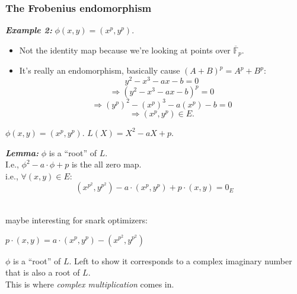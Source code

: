 \documentclass[shadesubsections,compress,14pt,mathserif]{beamer}
\newcommand{\Fclosure}{\ensuremath{{\overline{\mathbb{F}}}_p}}
\newcommand{\set}[1]{\ensuremath{\left\{#1\right\}}}
\newcommand{\defeq}{\ensuremath{:=}}
\newcommand{\hl}[1]{\textbf{\textit{#1}}}
\newcommand{\nl}{\\ \pause \vspace{0.2in}}
\newcommand{\nlnp}{\\ \vspace{0.2in}}
\begin{document}
\begin{frame}
\frametitle{The Frobenius endomorphism}

\hl{Example 2:}
 $\phi(x,y)=(x^p,y^p)$.\pause
 \begin{itemize}
  \item Not the identity map because we're looking at points over \Fclosure.\pause
  \item It's really an endomorphism, basically cause $(A+B)^p = A^p+B^p$:\pause
  \[y^2-x^3-ax-b=0\]\pause
  \[\Rightarrow \left(y^2-x^3-ax-b\right)^p=0\]\pause
  \[\Rightarrow (y^p)^2-(x^p)^3-a(x^p)-b =0\]\pause
  \[\Rightarrow (x^p,y^p)\in E.\]

 \end{itemize}

\end{frame}



\begin{frame}
$\phi(x,y)=(x^p,y^p)$. $L(X)=X^2-aX+p$.\nlnp

\hl{Lemma:} $\phi$ is a ``root'' of $L$.\nl
I.e., $\phi^2-a\cdot \phi + p$ is the all zero map.\nl
i.e.,  $\forall (x,y)\in E$:
\[ (x^{p^2},y^{p^2})-a\cdot (x^p,y^p)+p\cdot (x,y)=0_E\]\nl

maybe interesting for snark optimizers: 

$p\cdot (x,y) = a\cdot (x^p,y^p) - (x^{p^2},y^{p^2})$
\end{frame}

% 
% 
% 
\begin{frame}
 $\phi$ is a ``root'' of $L$. Left to show it corresponds to a complex imaginary number that is also a root of $L$.\nl
 This is where \emph{complex multiplication} comes in.
\end{frame}
\end{document}

